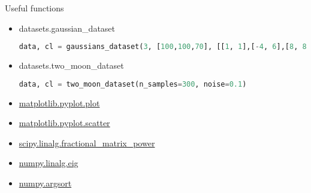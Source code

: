 \begin{frame}[fragile]{Useful functions}
\begin{itemize}
\item datasets.gaussian\_dataset
\begin{lstlisting}[frame=single, language=Python,basicstyle=\tiny]    
data, cl = gaussians_dataset(3, [100,100,70], [[1, 1],[-4, 6],[8, 8]], [[1, 1],[3, 3],[1, 1]])
\end{lstlisting}
\item datasets.two\_moon\_dataset
\begin{lstlisting}[frame=single, language=Python,basicstyle=\tiny]    
data, cl = two_moon_dataset(n_samples=300, noise=0.1)
\end{lstlisting}
\item \href{https://matplotlib.org/api/pyplot_api.html#matplotlib.pyplot.plot}{matplotlib.pyplot.plot}
\item \href{https://matplotlib.org/api/pyplot_api.html#matplotlib.pyplot.scatter}{matplotlib.pyplot.scatter}
\item \href{https://docs.scipy.org/doc/scipy-0.15.1/reference/generated/scipy.linalg.fractional_matrix_power.html
}{scipy.linalg.fractional\_matrix\_power}
\item \href{https://docs.scipy.org/doc/numpy-1.12.0/reference/generated/numpy.linalg.eig.html
}{numpy.linalg.eig}
\item \href{https://docs.scipy.org/doc/numpy-1.11.0/reference/generated/numpy.argsort.html}{numpy.argsort}\end{itemize}
\end{frame}